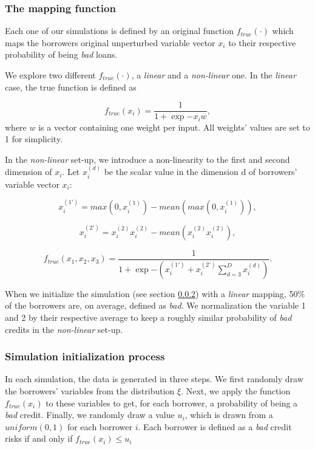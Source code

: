 \documentclass[12pt]{article} %
\begin{document}
\subsubsection{The mapping function}
\label{sec:mapping_function}
Each one of our simulations is defined by an original function $f_{true}(\cdot)$ which maps the borrowers original unperturbed variable vector $x_i$ to their respective probability of being \textit{bad} loans. 

We explore two different $f_{true}(\cdot)$, a \textit{linear} and a \textit{non-linear} one. In the \textit{linear} case, the true function is defined as 

\begin{equation}
f_{true}(x_i) = \frac{1}{1 + \exp{-x_i w}},
\end{equation}
where $w$ is a vector containing one weight per input. All weights' values are set to 1 for simplicity. 

In the \textit{non-linear} set-up, we introduce a non-linearity to the first and second dimension of $x_i$. Let $x_i^{(d)}$ be the scalar value in the dimension d of borrowers' variable vector $x_i$:

\begin{equation}\label{equ:mapping_lin}
x_i^{(1')} = max(0,x_i^{(1)})-mean(max(0,x_i^{(1)})),
\end{equation}

\begin{equation}
x_i^{(2')}= x_i^{(2)} x_i^{(2)} - mean(x_i^{(2)} x_i^{(2)}),
\end{equation}

\begin{equation}\label{equ:mapping_non_lin}
f_{true}(x_1,x_2,x_3) = \frac{1}{1 + 
\exp{-
\left(
x_i^{(1')} + x_i^{(2')} \sum_{d=3}^D x_i^{(d)}
\right)
}
}.
\end{equation}

When we initialize the simulation (see section \ref{sec:simulation_inilization_process}) with a \textit{linear} mapping, 50\% of the borrowers are, on average, defined as \textit{bad}. We normalization the variable 1 and 2 by their respective average to keep a roughly similar probability of \textit{bad} credits in the \textit{non-linear} set-up. 

\subsubsection{Simulation initialization process}
\label{sec:simulation_inilization_process}
In each simulation, the data is generated in three steps. We first randomly draw the borrowers' variables from the distribution $\xi$. Next, we apply the function $f_{true}(x_i)$ to these variables to get, for each borrower, a probability of being a \textit{bad} credit. Finally, we randomly draw a value $u_i$, which is drawn from a $uniform(0,1)$ for each borrower $i$. Each borrower is defined as a \textit{bad} credit risks if and only if $f_{true}(x_i)\leq u_i$ 
\end{document}
